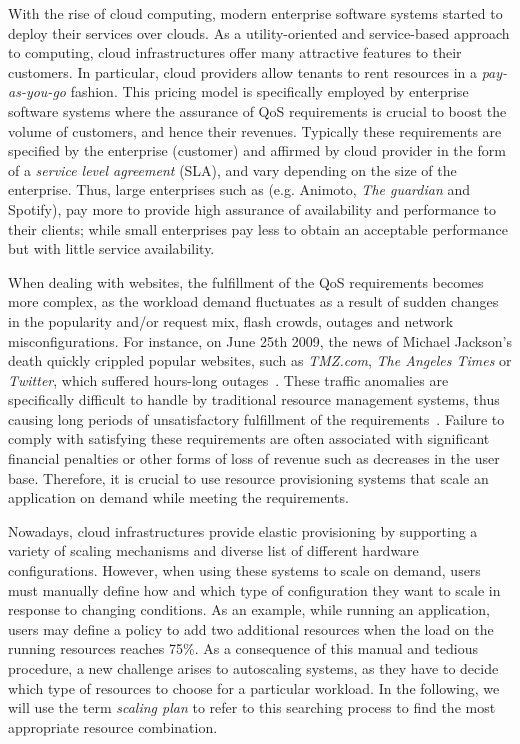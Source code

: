With the rise of cloud computing, modern enterprise software systems started to deploy their services over clouds. As a utility-oriented and service-based approach to computing, cloud infrastructures offer many attractive features to their customers.  In particular, cloud providers allow tenants to rent resources in a \emph{pay-as-you-go} fashion. This pricing model is specifically employed by enterprise software systems where the assurance of QoS requirements is crucial to boost the volume of customers, and hence their revenues. Typically these requirements are specified by the enterprise (customer) and affirmed by cloud provider in the form of a \emph{service level agreement} (SLA), and vary depending on the size of the enterprise. Thus, large enterprises such as (e.g. Animoto, \emph{The guardian} and Spotify), pay more to provide high assurance of availability and performance to their clients; while small enterprises pay less to obtain an acceptable performance but with little service availability. 



When dealing with websites, the fulfillment of the QoS requirements becomes more complex, as the workload demand fluctuates as a result of sudden changes in the popularity and/or request mix, flash crowds, outages and network misconfigurations.
For instance, on June 25th 2009, the news of Michael Jackson's death quickly crippled popular websites, such as \emph{TMZ.com}, \emph{The Angeles Times} or \emph{Twitter}, which suffered hours-long outages~\cite{outagesTimes}. These traffic anomalies are specifically difficult to handle by traditional resource management systems, thus causing long periods of unsatisfactory fulfillment of the requirements~\cite{trafficCongestion}. Failure to comply with satisfying these requirements are often associated with significant financial penalties or other forms of loss of revenue such as decreases in the user base. 
Therefore, it is crucial to use resource provisioning systems that scale an application on demand while meeting the requirements.

Nowadays, cloud infrastructures provide elastic provisioning by supporting a variety of scaling mechanisms and diverse list of different hardware configurations. However, when using these systems to scale on demand, users must manually define how and which type of configuration they want to scale in response to changing conditions. As an example, while running an application, users may define a policy to add two additional resources when the load on the running resources reaches 75\%.  As a consequence of this manual and tedious procedure, a new challenge arises to autoscaling systems, as they have to decide which type of resources to choose for a particular workload. In the following, we will use the term \emph{scaling plan} to refer to this searching process to find the most appropriate resource combination.

